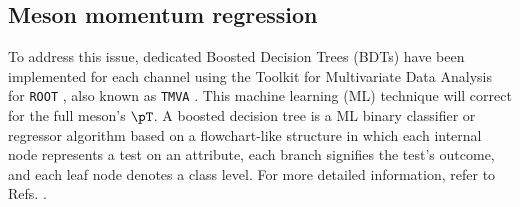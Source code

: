 \subsection{Meson momentum regression}

To address this issue, dedicated Boosted Decision Trees (BDTs) have been implemented for each channel using the Toolkit for Multivariate Data Analysis for \verb+ROOT+ \cite{CERN:root}, also known as \verb+TMVA+ \cite{TMVA:2007ngy}. This machine learning (ML) technique will correct for the full meson's $\pT$. A boosted decision tree is a ML binary classifier or regressor algorithm based on a flowchart-like structure in which each internal node represents a test on an attribute, each branch signifies the test's outcome, and each leaf node denotes a class level. For more detailed information, refer to Refs. \cite{TMVA:2007ngy, Coadou:2022nsh}.

